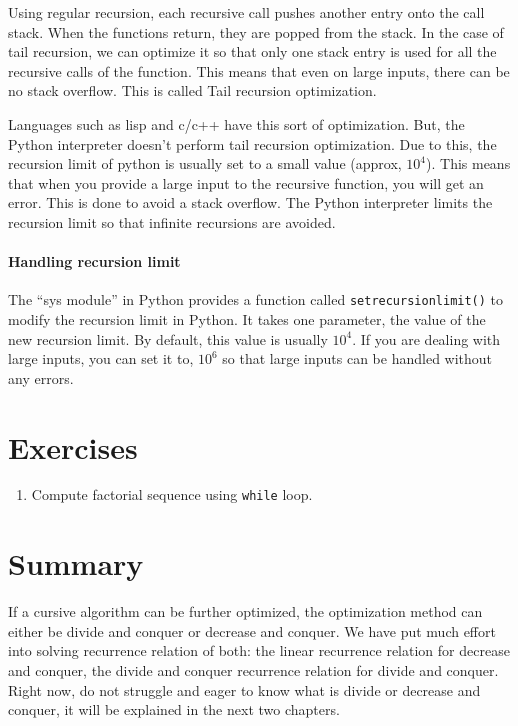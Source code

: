 \documentclass[../main.tex]{subfiles}
\begin{document}
Using regular recursion, each recursive call pushes another entry onto the call stack. When the functions return, they are popped from the stack. In the case of tail recursion, we can optimize it so that only one stack entry is used for all the recursive calls of the function. This means that even on large inputs, there can be no stack overflow. This is called Tail recursion optimization.

Languages such as lisp and c/c++ have this sort of optimization. But, the Python interpreter doesn’t perform tail recursion optimization. Due to this, the recursion limit of python is usually set to a small value (approx, $10^4$). This means that when you provide a large input to the recursive function, you will get an error. This is done to avoid a stack overflow. The Python interpreter limits the recursion limit so that infinite recursions are avoided.

 
\paragraph{Handling recursion limit}
The ``sys module'' in Python provides a function called \texttt{setrecursionlimit()} to modify the recursion limit in Python. It takes one parameter, the value of the new recursion limit. By default, this value is usually $10^4$. If you are dealing with large inputs, you can set it to, $10^6$ so that large inputs can be handled without any errors.



\section{Exercises}
\begin{enumerate}
    \item Compute factorial sequence using \texttt{while} loop.
\end{enumerate}

\section{Summary}
If a cursive algorithm can be further optimized, the optimization method can either be divide and conquer or decrease and conquer. We have put much effort into solving recurrence relation of both: the linear recurrence relation for decrease and conquer, the divide and conquer recurrence relation for divide and conquer.  Right now, do not struggle and eager to know what is divide or decrease and conquer, it will be explained in the next two chapters. 
\end{document}

